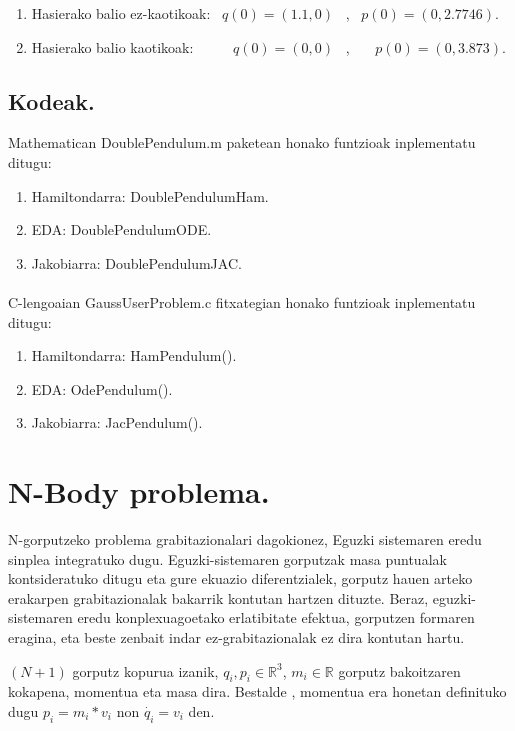 \begin{enumerate}
   \item Hasierako balio ez-kaotikoak:   
   \ $q(0)=(1.1, 0)$ \ , \ $p(0)=(0,2.7746)$.    
   \item Hasierako balio kaotikoak: \ \ \ \ \    
   $q(0)=(0,0)$ \ , \ \ \  $p(0)=(0,3.873)$.
\end{enumerate}


\subsection{Kodeak.}

Mathematican DoublePendulum.m paketean honako funtzioak inplementatu ditugu:

\begin{enumerate}
   \item Hamiltondarra: DoublePendulumHam.
   \item EDA: DoublePendulumODE.
   \item Jakobiarra: DoublePendulumJAC.
\end{enumerate}

\paragraph*{}C-lengoaian GaussUserProblem.c fitxategian honako funtzioak inplementatu ditugu:

\begin{enumerate}
   \item Hamiltondarra: HamPendulum().
   \item EDA: OdePendulum().
   \item Jakobiarra: JacPendulum().
\end{enumerate}

\section{N-Body problema.}

N-gorputzeko problema grabitazionalari dagokionez, Eguzki sistemaren eredu sinplea integratuko dugu. Eguzki-sistemaren gorputzak masa puntualak kontsideratuko ditugu eta gure ekuazio diferentzialek, gorputz hauen arteko erakarpen grabitazionalak bakarrik kontutan hartzen dituzte. Beraz, eguzki-sistemaren eredu konplexuagoetako erlatibitate efektua, gorputzen formaren eragina, eta beste zenbait indar ez-grabitazionalak ez dira kontutan hartu.

$(N+1)$ gorputz kopurua izanik, $q_i,p_i\in \mathbb{R}^3$, $m_i \in \mathbb{R}$ gorputz bakoitzaren kokapena, momentua eta masa dira. Bestalde , momentua era honetan definituko dugu $p_i=m_i*v_i$ non $\dot{q_i}=v_i$ den.


